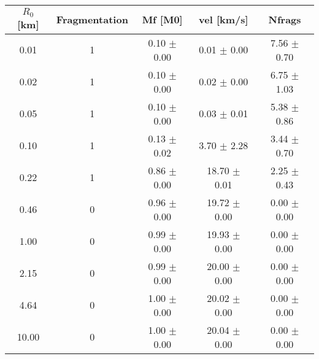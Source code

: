 \begin{tabular}{|c||c||c||c||c|}
\toprule
$R_0$ [km] & Fragmentation & Mf [M0] & vel [km/s] & Nfrags \\
\midrule
0.01 & 1 & 0.10 $\pm$ 0.00 & 0.01 $\pm$ 0.00 & 7.56 $\pm$ 0.70 \\
0.02 & 1 & 0.10 $\pm$ 0.00 & 0.02 $\pm$ 0.00 & 6.75 $\pm$ 1.03 \\
0.05 & 1 & 0.10 $\pm$ 0.00 & 0.03 $\pm$ 0.01 & 5.38 $\pm$ 0.86 \\
0.10 & 1 & 0.13 $\pm$ 0.02 & 3.70 $\pm$ 2.28 & 3.44 $\pm$ 0.70 \\
0.22 & 1 & 0.86 $\pm$ 0.00 & 18.70 $\pm$ 0.01 & 2.25 $\pm$ 0.43 \\
0.46 & 0 & 0.96 $\pm$ 0.00 & 19.72 $\pm$ 0.00 & 0.00 $\pm$ 0.00 \\
1.00 & 0 & 0.99 $\pm$ 0.00 & 19.93 $\pm$ 0.00 & 0.00 $\pm$ 0.00 \\
2.15 & 0 & 0.99 $\pm$ 0.00 & 20.00 $\pm$ 0.00 & 0.00 $\pm$ 0.00 \\
4.64 & 0 & 1.00 $\pm$ 0.00 & 20.02 $\pm$ 0.00 & 0.00 $\pm$ 0.00 \\
10.00 & 0 & 1.00 $\pm$ 0.00 & 20.04 $\pm$ 0.00 & 0.00 $\pm$ 0.00 \\
\bottomrule
\end{tabular}
